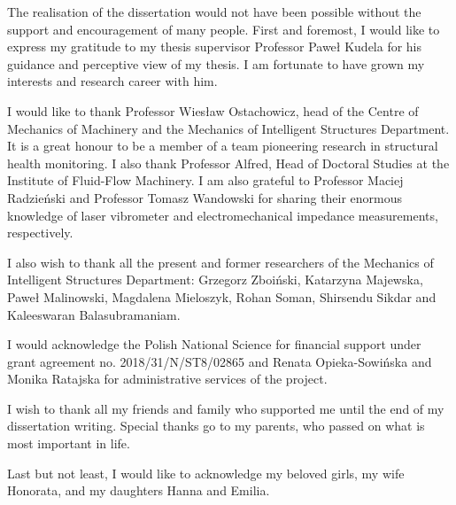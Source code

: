 \beforepreface
The realisation of the dissertation would not have been possible without the support and encouragement of many people.
First and foremost, I would like to express my gratitude to my thesis supervisor Professor Paweł Kudela for his guidance and perceptive view of my thesis.
I am fortunate to have grown my interests and research career with him.

I would like to thank Professor Wiesław Ostachowicz, head of the Centre of Mechanics of Machinery and the Mechanics of Intelligent Structures Department.
It is a great honour to be a member of a team pioneering research in structural health monitoring.
I also thank Professor Alfred, Head of Doctoral Studies at the Institute of Fluid-Flow Machinery.
I am also grateful to Professor Maciej Radzieński and Professor Tomasz Wandowski for sharing their enormous knowledge of laser vibrometer and electromechanical impedance measurements, respectively.

I also wish to thank all the present and former researchers of the Mechanics of Intelligent Structures Department: Grzegorz Zboiński, Katarzyna Majewska, Paweł Malinowski, Magdalena Mieloszyk, Rohan Soman, Shirsendu Sikdar and Kaleeswaran Balasubramaniam.

I would acknowledge the Polish National Science for financial support under grant agreement no. 2018/31/N/ST8/02865 and Renata Opieka-Sowińska and Monika Ratajska for administrative services of the project.

I wish to thank all my friends and family who supported me until the end of my dissertation writing. Special thanks go to my parents, who passed on what is most important in life.

Last but not least, I would like to acknowledge my beloved girls, my wife Honorata, and my daughters Hanna and Emilia.
\afterpreface